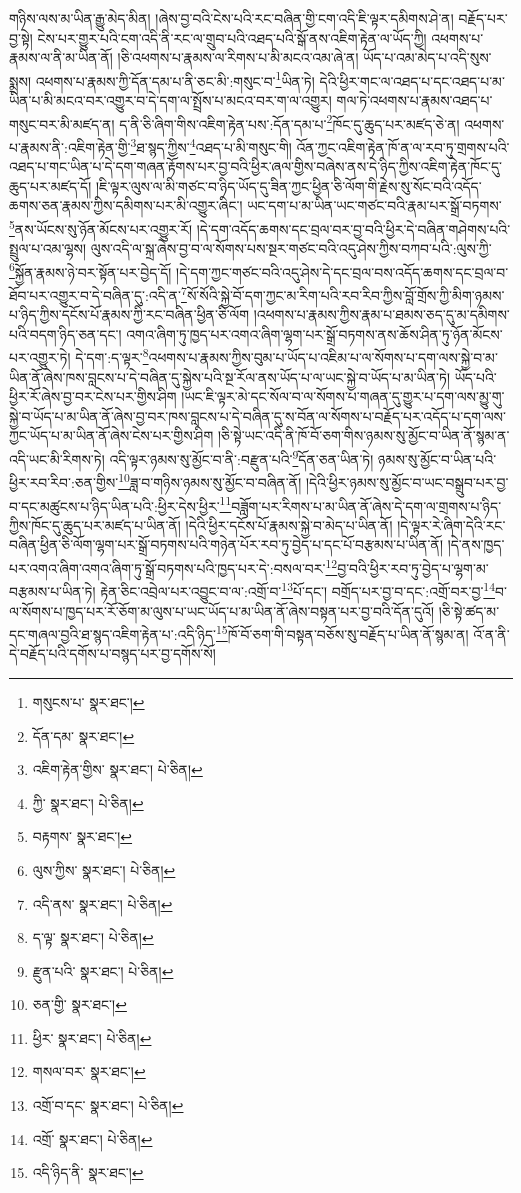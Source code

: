 གཉིས་ལས་མ་ཡིན་རྒྱུ་མེད་མིན། །ཞེས་བྱ་བའི་ངེས་པའི་རང་བཞིན་གྱི་ངག་འདི་ཇི་ལྟར་དམིགས་ཤེ་ན། བརྗོད་པར་བྱ་སྟེ། ངེས་པར་གྱུར་པའི་ངག་འདི་ནི་རང་ལ་གྲུབ་པའི་འཐད་པའི་སྒོ་ནས་འཇིག་རྟེན་ལ་ཡོད་ཀྱི། འཕགས་པ་རྣམས་ལ་ནི་མ་ཡིན་ནོ། །ཅི་འཕགས་པ་རྣམས་ལ་རིགས་པ་མི་མངའ་འམ་ཞེ་ན། ཡོད་པ་འམ་མེད་པ་འདི་སུས་སྨྲས། འཕགས་པ་རྣམས་ཀྱི་དོན་དམ་པ་ནི་ཅང་མི་:གསུང་བ་\footnote{གསུངས་པ་  སྣར་ཐང་། }ཡིན་ཏེ། དེའི་ཕྱིར་གང་ལ་འཐད་པ་དང་འཐད་པ་མ་ཡིན་པ་མི་མངའ་བར་འགྱུར་བ་དེ་དག་ལ་སྤྲོས་པ་མངའ་བར་ག་ལ་འགྱུར། གལ་ཏེ་འཕགས་པ་རྣམས་འཐད་པ་གསུང་བར་མི་མཛད་ན། ད་ནི་ཅི་ཞིག་གིས་འཇིག་རྟེན་པས་:དོན་དམ་པ་\footnote{དོན་དམ་  སྣར་ཐང་། }ཁོང་དུ་ཆུད་པར་མཛད་ཅེ་ན། འཕགས་པ་རྣམས་ནི་:འཇིག་རྟེན་གྱི་\footnote{འཇིག་རྟེན་གྱིས་  སྣར་ཐང་།  པེ་ཅིན། }ཐ་སྙད་ཀྱིས་\footnote{ཀྱི་  སྣར་ཐང་།  པེ་ཅིན། }འཐད་པ་མི་གསུང་གི། འོན་ཀྱང་འཇིག་རྟེན་ཁོ་ན་ལ་རབ་ཏུ་གྲགས་པའི་འཐད་པ་གང་ཡིན་པ་དེ་དག་གཞན་རྟོགས་པར་བྱ་བའི་ཕྱིར་ཞལ་གྱིས་བཞེས་ནས་དེ་ཉིད་ཀྱིས་འཇིག་རྟེན་ཁོང་དུ་ཆུད་པར་མཛད་དོ། །ཇི་ལྟར་ལུས་ལ་མི་གཙང་བ་ཉིད་ཡོད་དུ་ཟིན་ཀྱང་ཕྱིན་ཅི་ལོག་གི་རྗེས་སུ་སོང་བའི་འདོད་ཆགས་ཅན་རྣམས་ཀྱིས་དམིགས་པར་མི་འགྱུར་ཞིང་། ཡང་དག་པ་མ་ཡིན་ཡང་གཙང་བའི་རྣམ་པར་སྒྲོ་བཏགས་\footnote{བརྟགས་  སྣར་ཐང་། }ནས་ཡོངས་སུ་ཉོན་མོངས་པར་འགྱུར་རོ། །དེ་དག་འདོད་ཆགས་དང་བྲལ་བར་བྱ་བའི་ཕྱིར་དེ་བཞིན་གཤེགས་པའི་སྤྲུལ་པ་འམ་ལྷས། ལུས་འདི་ལ་སྐྲ་ཞེས་བྱ་བ་ལ་སོགས་པས་སྔར་གཙང་བའི་འདུ་ཤེས་ཀྱིས་བཀབ་པའི་:ལུས་ཀྱི་\footnote{ལུས་ཀྱིས་  སྣར་ཐང་།  པེ་ཅིན། }སྐྱོན་རྣམས་ཉེ་བར་སྟོན་པར་བྱེད་དོ། །དེ་དག་ཀྱང་གཙང་བའི་འདུ་ཤེས་དེ་དང་བྲལ་བས་འདོད་ཆགས་དང་བྲལ་བ་ཐོབ་པར་འགྱུར་བ་དེ་བཞིན་དུ་:འདི་ན་\footnote{འདི་ནས་  སྣར་ཐང་།  པེ་ཅིན། }སོ་སོའི་སྐྱེ་བོ་དག་ཀྱང་མ་རིག་པའི་རབ་རིབ་ཀྱིས་བློ་གྲོས་ཀྱི་མིག་ཉམས་པ་ཉིད་ཀྱིས་དངོས་པོ་རྣམས་ཀྱི་རང་བཞིན་ཕྱིན་ཅི་ལོག །འཕགས་པ་རྣམས་ཀྱིས་རྣམ་པ་ཐམས་ཅད་དུ་མ་དམིགས་པའི་བདག་ཉིད་ཅན་དང་། འགའ་ཞིག་ཏུ་ཁྱད་པར་འགའ་ཞིག་ལྷག་པར་སྒྲོ་བཏགས་ནས་ཆོས་ཤིན་ཏུ་ཉོན་མོངས་པར་འགྱུར་ཏེ། དེ་དག་:ད་ལྟར་\footnote{ད་ལྟ་  སྣར་ཐང་།  པེ་ཅིན། }འཕགས་པ་རྣམས་ཀྱིས་བུམ་པ་ཡོད་པ་འཇིམ་པ་ལ་སོགས་པ་དག་ལས་སྐྱེ་བ་མ་ཡིན་ནོ་ཞེས་ཁས་བླངས་པ་དེ་བཞིན་དུ་སྐྱེས་པའི་སྔ་རོལ་ནས་ཡོད་པ་ལ་ཡང་སྐྱེ་བ་ཡོད་པ་མ་ཡིན་ཏེ། ཡོད་པའི་ཕྱིར་རོ་ཞེས་བྱ་བར་ངེས་པར་གྱིས་ཤིག །ཡང་ཇི་ལྟར་མེ་དང་སོལ་བ་ལ་སོགས་པ་གཞན་དུ་གྱུར་པ་དག་ལས་མྱུ་གུ་སྐྱེ་བ་ཡོད་པ་མ་ཡིན་ནོ་ཞེས་བྱ་བར་ཁས་བླངས་པ་དེ་བཞིན་དུ་ས་བོན་ལ་སོགས་པ་བརྗོད་པར་འདོད་པ་དག་ལས་ཀྱང་ཡོད་པ་མ་ཡིན་ནོ་ཞེས་ངེས་པར་གྱིས་ཤིག །ཅི་སྟེ་ཡང་འདི་ནི་ཁོ་བོ་ཅག་གིས་ཉམས་སུ་མྱོང་བ་ཡིན་ནོ་སྙམ་ན་འདི་ཡང་མི་རིགས་ཏེ། འདི་ལྟར་ཉམས་སུ་མྱོང་བ་ནི་:བརྫུན་པའི་\footnote{རྫུན་པའི་  སྣར་ཐང་།  པེ་ཅིན། }དོན་ཅན་ཡིན་ཏེ། ཉམས་སུ་མྱོང་བ་ཡིན་པའི་ཕྱིར་རབ་རིབ་:ཅན་གྱིས་\footnote{ཅན་གྱི་  སྣར་ཐང་། }ཟླ་བ་གཉིས་ཉམས་སུ་མྱོང་བ་བཞིན་ནོ། །དེའི་ཕྱིར་ཉམས་སུ་མྱོང་བ་ཡང་བསྒྲུབ་པར་བྱ་བ་དང་མཚུངས་པ་ཉིད་ཡིན་པའི་:ཕྱིར་དེས་ཕྱིར་\footnote{ཕྱིར་  སྣར་ཐང་།  པེ་ཅིན། }བཟློག་པར་རིགས་པ་མ་ཡིན་ནོ་ཞེས་དེ་དག་ལ་གྲགས་པ་ཉིད་ཀྱིས་ཁོང་དུ་ཆུད་པར་མཛད་པ་ཡིན་ནོ། །དེའི་ཕྱིར་དངོས་པོ་རྣམས་སྐྱེ་བ་མེད་པ་ཡིན་ནོ། །དེ་ལྟར་རེ་ཞིག་དེའི་རང་བཞིན་ཕྱིན་ཅི་ལོག་ལྷག་པར་སྒྲོ་བཏགས་པའི་གཉེན་པོར་རབ་ཏུ་བྱེད་པ་དང་པོ་བརྩམས་པ་ཡིན་ནོ། །དེ་ནས་ཁྱད་པར་འགའ་ཞིག་འགའ་ཞིག་ཏུ་སྒྲོ་བཏགས་པའི་ཁྱད་པར་དེ་:བསལ་བར་\footnote{གསལ་བར་  སྣར་ཐང་། }བྱ་བའི་ཕྱིར་རབ་ཏུ་བྱེད་པ་ལྷག་མ་བརྩམས་པ་ཡིན་ཏེ། རྟེན་ཅིང་འབྲེལ་པར་འབྱུང་བ་ལ་:འགྲོ་བ་\footnote{འགྲོ་བ་དང་  སྣར་ཐང་།  པེ་ཅིན། }པོ་དང་། བགྲོད་པར་བྱ་བ་དང་:འགྲོ་བར་བྱ་\footnote{འགྲོ་  སྣར་ཐང་།  པེ་ཅིན། }བ་ལ་སོགས་པ་ཁྱད་པར་རོ་ཅོག་མ་ལུས་པ་ཡང་ཡོད་པ་མ་ཡིན་ནོ་ཞེས་བསྟན་པར་བྱ་བའི་དོན་དུའོ། །ཅི་སྟེ་ཚད་མ་དང་གཞལ་བྱའི་ཐ་སྙད་འཇིག་རྟེན་པ་:འདི་ཉིད་\footnote{འདི་ཉིད་ནི་  སྣར་ཐང་། }ཁོ་བོ་ཅག་གི་བསྟན་བཅོས་སུ་བརྗོད་པ་ཡིན་ནོ་སྙམ་ན། འོ་ན་ནི་དེ་བརྗོད་པའི་དགོས་པ་བསྙད་པར་བྱ་དགོས་སོ། 